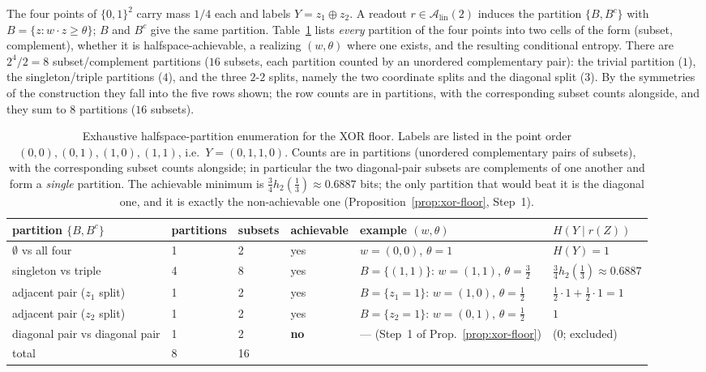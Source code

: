 \documentclass[twocolumn,10pt]{article}
\theoremstyle{definition}
\theoremstyle{remark}
\newcommand{\cA}{\mathcal{A}}
\newcommand{\Alin}{\cA_{\mathrm{lin}}}
\newcommand{\hb}{h_2}
\begin{document}
The four points of $\{0,1\}^2$ carry mass $1/4$ each and labels
$Y = z_1 \oplus z_2$. A readout $r \in \Alin(2)$ induces the partition
$\{B, B^c\}$ with $B = \{z : w \cdot z \ge \theta\}$; $B$ and $B^c$ give
the same partition. Table~\ref{tab:app-xor} lists \emph{every} partition
of the four points into two cells of the form (subset, complement),
whether it is halfspace-achievable, a realizing $(w, \theta)$ where one
exists, and the resulting conditional entropy. There are $2^4/2 = 8$
subset/complement partitions ($16$ subsets, each partition counted by an
unordered complementary pair): the trivial partition ($1$), the
singleton/triple partitions ($4$), and the three $2$-$2$ splits, namely
the two coordinate splits and the diagonal split ($3$). By the symmetries of
the construction they fall into the five rows shown; the row counts are
in partitions, with the corresponding subset counts alongside, and they
sum to $8$ partitions ($16$ subsets).

\begin{table}[H]
\centering
\caption{Exhaustive halfspace-partition enumeration for the XOR floor.
Labels are listed in the point order $(0,0), (0,1), (1,0), (1,1)$, i.e.\
$Y = (0, 1, 1, 0)$. Counts are in partitions (unordered complementary
pairs of subsets), with the corresponding subset counts alongside; in
particular the two diagonal-pair subsets are complements of one another
and form a \emph{single} partition. The achievable minimum is
$\tfrac34 \hb(\tfrac13) \approx 0.6887$ bits; the only partition that
would beat it is the diagonal one, and it is exactly the
non-achievable one (Proposition~\ref{prop:xor-floor}, Step~1).}
\label{tab:app-xor}
\footnotesize
\begin{tabular}{llllll}
\toprule
partition $\{B, B^c\}$ & partitions & subsets & achievable &
example $(w, \theta)$ &
$H(Y \mid r(Z))$ \\
\midrule
$\emptyset$ vs all four & 1 & 2 & yes & $w = (0,0)$, $\theta = 1$ &
$H(Y) = 1$ \\
singleton vs triple & 4 & 8 & yes & $B = \{(1,1)\}$: $w = (1,1)$,
$\theta = \tfrac32$ &
$\tfrac34 \hb(\tfrac13) \approx 0.6887$ \\
adjacent pair ($z_1$ split) & 1 & 2 & yes & $B = \{z_1 = 1\}$:
$w = (1,0)$,
$\theta = \tfrac12$ & $\tfrac12 \cdot 1 + \tfrac12 \cdot 1 = 1$ \\
adjacent pair ($z_2$ split) & 1 & 2 & yes & $B = \{z_2 = 1\}$:
$w = (0,1)$,
$\theta = \tfrac12$ & $1$ \\
diagonal pair vs diagonal pair & 1 & 2 & \textbf{no} & --- (Step~1 of
Prop.~\ref{prop:xor-floor}) & ($0$; excluded) \\
\midrule
total & 8 & 16 & & & \\
\bottomrule
\end{tabular}
\end{table}
\end{document}
